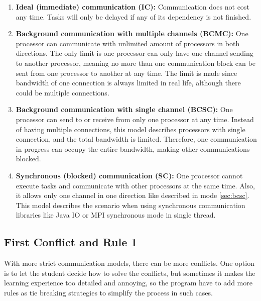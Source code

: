 \documentclass[msc,deptreport, cs]{infthesis}
\begin{document}
\begin{enumerate}
  \item \textbf{Ideal (immediate) communication (IC):} Communication does not cost any time. Tasks will only be delayed if any of its dependency is not finished.
  \item \textbf{Background communication with multiple channels (BCMC):} One processor can communicate with unlimited amount of processors in both directions. The only limit is one processor can only have one channel sending to another processor, meaning no more than one communication block can be sent from one processor to another at any time. The limit is made since bandwidth of one connection is always limited in real life, although there could be multiple connections.
  \item \label{sec:bcsc} \textbf{Background communication with single channel (BCSC):} One processor can send to or receive from only one processor at any time. Instead of having multiple connections, this model describes processors with single connection, and the total bandwidth is limited. Therefore, one communication in progress can occupy the entire bandwidth, making other communications blocked.
  \item \textbf{Synchronous (blocked) communication (SC):} One processor cannot execute tasks and communicate with other processors at the same time. Also, it allows only one channel in one direction like described in mode \ref{sec:bcsc}. This model describes the scenario when using synchronous communication libraries like Java IO or MPI synchronous mode in single thread.
\end{enumerate}

\subsection{First Conflict and Rule 1}

With more strict communication models, there can be more conflicts. One option is to let the student decide how to solve the conflicts, but sometimes it makes the learning experience too detailed and annoying, so the program have to add more rules as tie breaking strategies to simplify the process in such cases.
\end{document}
